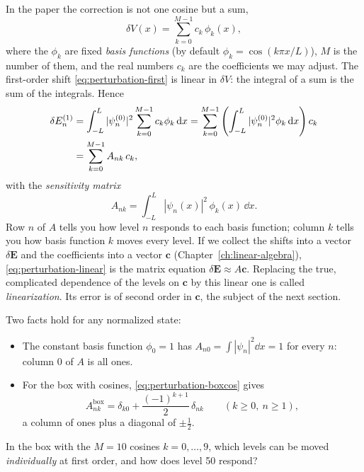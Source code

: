 In the paper the correction is not one cosine but a sum,
\begin{equation}
\delta V(x)=\sum_{k=0}^{M-1}c_k\,\phi_k(x),
\label{eq:perturbation-basis}
\end{equation}
where the $\phi_k$ are fixed \emph{basis functions} (by default $\phi_k=\cos(k\pi x/L)$), $M$ is the number of them, and the real numbers $c_k$ are the coefficients we may adjust. The first-order shift \cref{eq:perturbation-first} is linear in $\delta V$: the integral of a sum is the sum of the integrals. Hence
\begin{align}
\delta E_n^{(1)}&=\int_{-L}^{L}|\psi_n^{(0)}|^2\sum_{k=0}^{M-1}c_k\phi_k\,\mathrm{d} x
=\sum_{k=0}^{M-1}\left(\int_{-L}^{L}|\psi_n^{(0)}|^2\phi_k\,\mathrm{d} x\right)c_k \notag\\
&=\sum_{k=0}^{M-1}A_{nk}\,c_k,
\label{eq:perturbation-linear}
\end{align}
with the \emph{sensitivity matrix}
\begin{equation}
A_{nk}=\int_{-L}^{L}|\psi_n(x)|^2\,\phi_k(x)\,\dd x .
\label{eq:perturbation-Ank}
\end{equation}
Row $n$ of $A$ tells you how level $n$ responds to each basis function; column $k$ tells you how basis function $k$ moves every level. If we collect the shifts into a vector $\delta\bm E$ and the coefficients into a vector $\bm c$ (Chapter~\ref{ch:linear-algebra}), \cref{eq:perturbation-linear} is the matrix equation $\delta\bm E\approx A\bm c$. Replacing the true, complicated dependence of the levels on $\bm c$ by this linear one is called \emph{linearization}. Its error is of second order in $\bm c$, the subject of the next section.

Two facts hold for any normalized state:
\begin{itemize}
\item The constant basis function $\phi_0=1$ has $A_{n0}=\int|\psi_n|^2\dd x=1$ for every $n$: column 0 of $A$ is all ones.
\item For the box with cosines, \cref{eq:perturbation-boxcos} gives
\begin{equation}
A_{nk}^{\text{box}}=\delta_{k0}+\frac{(-1)^{k+1}}{2}\,\delta_{nk}\qquad(k\ge0,\ n\ge1),
\label{eq:perturbation-Abox}
\end{equation}
a column of ones plus a diagonal of $\pm\tfrac12$.
\end{itemize}

\begin{checkpoint}
In the box with the $M=10$ cosines $k=0,\dots,9$, which levels can be moved \emph{individually} at first order, and how does level 50 respond?
\end{checkpoint}

